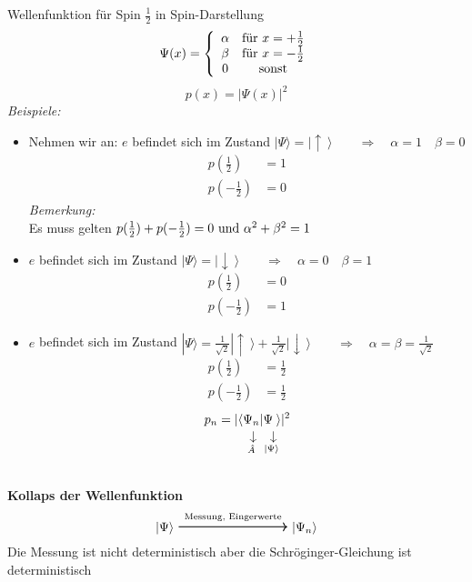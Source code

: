 Wellenfunktion für Spin $ \frac{1}{2} $ in Spin-Darstellung
\begin{equation*}
\Psi (x) = \left\{ \begin{array}{cc}
\alpha & \textrm{für } x = + \frac{1}{2} \\
\beta & \textrm{für } x = - \frac{1}{2} \\
0 & \textrm{sonst}
\end{array} \right.
\end{equation*}
\begin{equation*}
p(x) = | \Psi(x) |^2
\end{equation*}
\emph{Beispiele:}
\begin{itemize}
	\item Nehmen wir an: $ e $ befindet sich im Zustand $ | \Psi \rangle = | \uparrow \: \rangle \qquad \Rightarrow \quad \alpha = 1 \quad \beta = 0 $
	\begin{align*}
	p\left(\frac{1}{2}\right) &= 1 \\
	p\left(-\frac{1}{2}\right) &= 0
	\end{align*}
	\emph{Bemerkung:}\\
	Es muss gelten $ p(\frac{1}{2}) + p(-\frac{1}{2}) = 0 \textrm{ und } \alpha^2 + \beta^2 = 1 $
	\item $ e $ befindet sich im Zustand $ |\Psi \rangle = | \downarrow \: \rangle \qquad \Rightarrow \quad \alpha = 0 \quad \beta = 1 $
	\begin{align*}
	p\left(\frac{1}{2}\right) &= 0 \\
	p\left(-\frac{1}{2}\right) &= 1
	\end{align*}
	\item $ e $ befindet sich im Zustand $ |\Psi \rangle = \frac{1}{\sqrt{2}} | \uparrow \: \rangle + \frac{1}{\sqrt{2}} | \downarrow \: \rangle \qquad \Rightarrow \quad \alpha = \beta = \frac{1}{\sqrt{2}} $
	\begin{align*}
	p\left(\frac{1}{2}\right) &= \frac{1}{2} \\
	p\left(-\frac{1}{2}\right) &= \frac{1}{2}
	\end{align*}
	\begin{equation*}
	p_n = | \langle \custo{\rightarrow}{\Psi_n}{\hat{A}} | \custo{\rightarrow}{\Psi_{\phantom{n}}}{|\Psi \rangle} \hspace{-3pt} \rangle | ^2
	\end{equation*}
\end{itemize}
\\[5pt]
\textbf{Kollaps der Wellenfunktion}
\begin{equation*}
| \Psi \rangle \ \overset{\tx{Messung, Eingerwerte}}{\begin{tikzpicture}
	\draw[thick,->] (0,0) -- (3,0);
	\end{tikzpicture}} \ | \Psi_n \rangle
\end{equation*}
Die Messung ist nicht deterministisch aber die Schröginger-Gleichung ist deterministisch \Huge{\lightning} \normalsize


